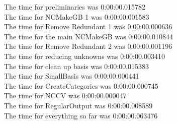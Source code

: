 \documentclass[rep10,leqno]{report}
\begin{document}
\noindent
The time for preliminaries was 0:00:00.015782\\
The time for NCMakeGB 1 was 0:00:00.001583\\
The time for Remove Redundant 1 was 0:00:00.000636\\
The time for the main NCMakeGB was 0:00:00.010844\\
The time for Remove Redundant 2 was 0:00:00.001196\\
The time for reducing unknowns was 0:00:00.003410\\
The time for clean up basis was 0:00:00.015383\\
The time for SmallBasis was 0:00:00.000441\\
The time for CreateCategories was 0:00:00.000745\\
The time for NCCV was 0:00:00.000047\\
The time for RegularOutput was 0:00:00.008589\\
The time for everything so far was 0:00:00.063476\\
\end{document}
